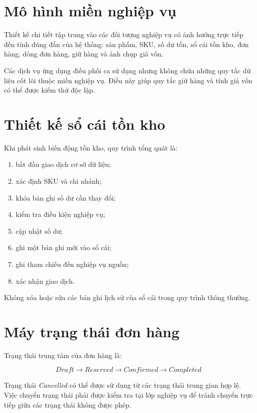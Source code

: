 \section{Mô hình miền nghiệp vụ}

Thiết kế chi tiết tập trung vào các đối tượng nghiệp vụ có ảnh hưởng trực tiếp đến tính đúng
đắn của hệ thống: sản phẩm, SKU, số dư tồn, sổ cái tồn kho, đơn hàng, dòng đơn hàng, giữ hàng
và ảnh chụp giá vốn.

Các dịch vụ ứng dụng điều phối ca sử dụng nhưng không chứa những quy tắc dữ liệu cốt lõi thuộc
miền nghiệp vụ. Điều này giúp quy tắc giữ hàng và tính giá vốn có thể được kiểm thử độc lập.

\section{Thiết kế sổ cái tồn kho}

Khi phát sinh biến động tồn kho, quy trình tổng quát là:

\begin{enumerate}
    \item bắt đầu giao dịch cơ sở dữ liệu;
    \item xác định SKU và chi nhánh;
    \item khóa bản ghi số dư cần thay đổi;
    \item kiểm tra điều kiện nghiệp vụ;
    \item cập nhật số dư;
    \item ghi một bản ghi mới vào sổ cái;
    \item ghi tham chiếu đến nghiệp vụ nguồn;
    \item xác nhận giao dịch.
\end{enumerate}

Không xóa hoặc sửa các bản ghi lịch sử của sổ cái trong quy trình thông thường.

\section{Máy trạng thái đơn hàng}

Trạng thái trung tâm của đơn hàng là:

\[
Draft \rightarrow Reserved \rightarrow Confirmed \rightarrow Completed
\]

Trạng thái \textit{Cancelled} có thể được sử dụng từ các trạng thái trung gian hợp lệ. Việc
chuyển trạng thái phải được kiểm tra tại lớp nghiệp vụ để tránh chuyển trực tiếp giữa các trạng
thái không được phép.

